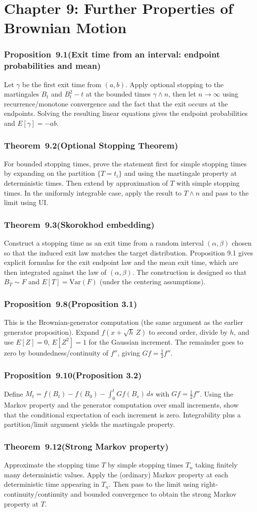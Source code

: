 \documentclass[11pt,a4paper]{article}
\newcommand{\proofcapsule}[4]{%
  \subsubsection*{#1~#2\quad \textnormal{\small(#3)}}%
  #4}
\begin{document}
\section{Chapter 9: Further Properties of Brownian Motion}
\proofcapsule{Proposition}{9.1}{Exit time from an interval: endpoint probabilities and mean}{Let $\gamma$ be the first exit time from $(a,b)$. Apply optional stopping to the martingales $B_t$ and $B_t^2-t$ at the bounded times $\gamma\wedge n$, then let $n\to\infty$ using recurrence/monotone convergence and the fact that the exit occurs at the endpoints. Solving the resulting linear equations gives the endpoint probabilities and $E[\gamma]=-ab$.}
\proofcapsule{Theorem}{9.2}{Optional Stopping Theorem}{For bounded stopping times, prove the statement first for simple stopping times by expanding on the partition $\{T=t_i\}$ and using the martingale property at deterministic times. Then extend by approximation of $T$ with simple stopping times. In the uniformly integrable case, apply the result to $T\wedge n$ and pass to the limit using UI.}
\proofcapsule{Theorem}{9.3}{Skorokhod embedding}{Construct a stopping time as an exit time from a random interval $(\alpha,\beta)$ chosen so that the induced exit law matches the target distribution. Proposition 9.1 gives explicit formulas for the exit endpoint law and the mean exit time, which are then integrated against the law of $(\alpha,\beta)$. The construction is designed so that $B_T\sim F$ and $E[T]=\mathrm{Var}(F)$ (under the centering assumptions).}
\proofcapsule{Proposition}{9.8}{Proposition 3.1}{This is the Brownian-generator computation (the same argument as the earlier generator proposition). Expand $f(x+\sqrt h\,Z)$ to second order, divide by $h$, and use $E[Z]=0$, $E[Z^2]=1$ for the Gaussian increment. The remainder goes to zero by boundedness/continuity of $f''$, giving $Gf=\tfrac12 f''$.}
\proofcapsule{Proposition}{9.10}{Proposition 3.2}{Define $M_t=f(B_t)-f(B_0)-\int_0^t Gf(B_s)\,ds$ with $Gf=\tfrac12 f''$. Using the Markov property and the generator computation over small increments, show that the conditional expectation of each increment is zero. Integrability plus a partition/limit argument yields the martingale property.}
\proofcapsule{Theorem}{9.12}{Strong Markov property}{Approximate the stopping time $T$ by simple stopping times $T_n$ taking finitely many deterministic values. Apply the (ordinary) Markov property at each deterministic time appearing in $T_n$. Then pass to the limit using right-continuity/continuity and bounded convergence to obtain the strong Markov property at $T$.}
\end{document}
